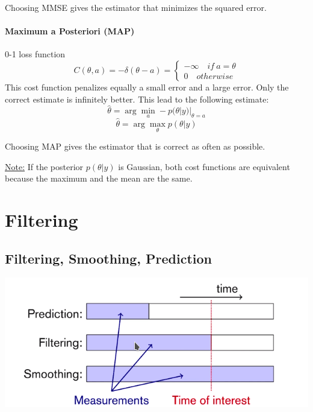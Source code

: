 Choosing MMSE gives the estimator that minimizes the squared error.

\paragraph{Maximum a Posteriori (MAP)}
0-1 loss function
\begin{equation}
    C(\theta, a) = -\delta(\theta-a) = \left\{\begin{array}{c}
        -\infty \quad if \: a=\theta  \\   
        0 \quad otherwise
    \end{array}\right.
\end{equation}
This cost function penalizes equally a small error and a large error. Only the correct estimate is infinitely better. This lead to the following estimate:
\begin{equation}
    \hat{\theta} = \arg\min_{a} -p(\theta|y) |_ {\theta=a}
\end{equation}
\begin{equation}
    \hat{\theta} = \arg\max_{\theta} p(\theta|y)
\end{equation}

Choosing MAP gives the estimator that is correct as often as possible.


\underline{Note:} If the posterior $p(\theta|y)$ is Gaussian, both cost functions are equivalent because the maximum and the mean are the same.

\section{Filtering}

\subsection{Filtering, Smoothing, Prediction}
\includegraphics[scale=0.5]{content/prediction_filtering_smoothing.png}

